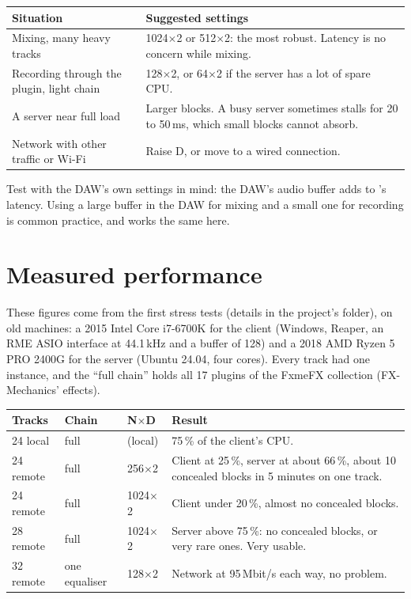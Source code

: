 \begin{longtable}{@{}p{}p{}@{}}
\toprule
\textbf{Situation} & \textbf{Suggested settings}\\
\midrule
\endhead
Mixing, many heavy tracks & 1024$\times$2 or 512$\times$2: the most robust. Latency is no concern while mixing.\\
Recording through the plugin, light chain & 128$\times$2, or 64$\times$2 if the server has a lot of spare CPU.\\
A server near full load & Larger blocks. A busy server sometimes stalls for 20 to 50\,ms, which small blocks cannot absorb.\\
Network with other traffic or Wi-Fi & Raise D, or move to a wired connection.\\
\bottomrule
\end{longtable}

\begin{tip}
Test with the DAW's own settings in mind: the DAW's audio buffer adds to
\fxme's latency. Using a large buffer in the DAW for mixing and a small one
for recording is common practice, and works the same here.
\end{tip}

\section{Measured performance}

These figures come from the first stress tests (details in the project's
 folder), on old machines: a 2015 Intel Core i7-6700K for the
client (Windows, Reaper, an RME ASIO interface at 44.1\,kHz and a buffer of
128) and a 2018 AMD Ryzen 5 PRO 2400G for the server (Ubuntu 24.04, four
cores). Every track had one  instance, and the ``full chain''
holds all 17 plugins of the FxmeFX collection (FX-Mechanics' effects).

\begin{longtable}{@{}p{}p{}p{}p{}@{}}
\toprule
\textbf{Tracks} & \textbf{Chain} & \textbf{N$\times$D} & \textbf{Result}\\
\midrule
\endhead
24 local & full & (local) & 75\,\% of the client's CPU.\\
24 remote & full & 256$\times$2 & Client at 25\,\%, server at about 66\,\%, about 10 concealed blocks in 5 minutes on one track.\\
24 remote & full & 1024$\times$2 & Client under 20\,\%, almost no concealed blocks.\\
28 remote & full & 1024$\times$2 & Server above 75\,\%: no concealed blocks, or very rare ones. Very usable.\\
32 remote & one equaliser & 128$\times$2 & Network at 95\,Mbit/s each way, no problem.\\
\bottomrule
\end{longtable}

